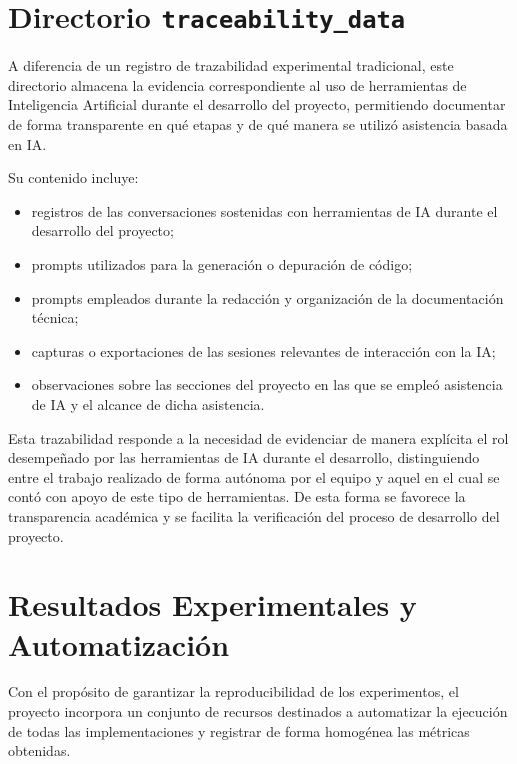 \section{Directorio \texttt{traceability\_data}}

A diferencia de un registro de trazabilidad experimental tradicional, este directorio almacena la evidencia correspondiente al uso de herramientas de Inteligencia Artificial durante el desarrollo del proyecto, permitiendo documentar de forma transparente en qué etapas y de qué manera se utilizó asistencia basada en IA.

Su contenido incluye:

\begin{itemize}

\item registros de las conversaciones sostenidas con herramientas de IA durante el desarrollo del proyecto;

\item prompts utilizados para la generación o depuración de código;

\item prompts empleados durante la redacción y organización de la documentación técnica;

\item capturas o exportaciones de las sesiones relevantes de interacción con la IA;

\item observaciones sobre las secciones del proyecto en las que se empleó asistencia de IA y el alcance de dicha asistencia.

\end{itemize}

Esta trazabilidad responde a la necesidad de evidenciar de manera explícita el rol desempeñado por las herramientas de IA durante el desarrollo, distinguiendo entre el trabajo realizado de forma autónoma por el equipo y aquel en el cual se contó con apoyo de este tipo de herramientas. De esta forma se favorece la transparencia académica y se facilita la verificación del proceso de desarrollo del proyecto.

\section{Resultados Experimentales y Automatización}

Con el propósito de garantizar la reproducibilidad de los experimentos, el proyecto incorpora un conjunto de recursos destinados a automatizar la ejecución de todas las implementaciones y registrar de forma homogénea las métricas obtenidas.

